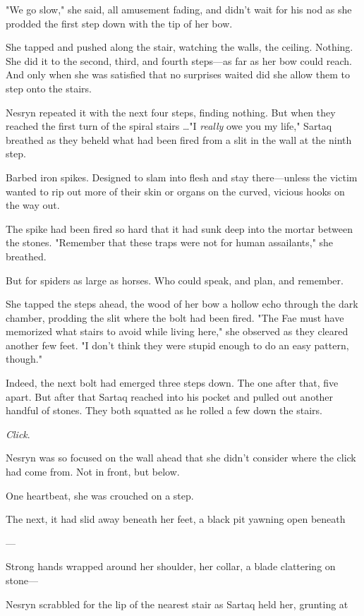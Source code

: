 "We go slow," she said, all amusement fading, and didn't wait for his nod as she prodded the first step down with the tip of her bow.

She tapped and pushed along the stair, watching the walls, the ceiling. Nothing. She did it to the second, third, and fourth steps---as far as her bow could reach. And only when she was satisfied that no surprises waited did she allow them to step onto the stairs.

Nesryn repeated it with the next four steps, finding nothing. But when they reached the first turn of the spiral stairs \ldots"I \emph{really}
owe you my life," Sartaq breathed as they beheld what had been fired from a slit in the wall at the ninth step.

Barbed iron spikes. Designed to slam into flesh and stay there---unless the victim wanted to rip out more of their skin or organs on the curved, vicious hooks on the way out.

The spike had been fired so hard that it had sunk deep into the mortar between the stones. "Remember that these traps were not for human assailants," she breathed.

But for spiders as large as horses. Who could speak, and plan, and remember.

She tapped the steps ahead, the wood of her bow a hollow echo through the dark chamber, prodding the slit where the bolt had been fired. "The Fae must have memorized what stairs to avoid while living here," she observed as they cleared another few feet. "I don't think they were stupid enough to do an easy pattern, though."

Indeed, the next bolt had emerged three steps down. The one after that, five apart. But after that  Sartaq reached into his pocket and pulled out another handful of stones. They both squatted as he rolled a few down the stairs.

\emph{Click}.

Nesryn was so focused on the wall ahead that she didn't consider where the click had come from. Not in front, but below.

One heartbeat, she was crouched on a step.

The next, it had slid away beneath her feet, a black pit yawning open beneath

---

Strong hands wrapped around her shoulder, her collar, a blade clattering on stone---

Nesryn scrabbled for the lip of the nearest stair as Sartaq held her, grunting at


